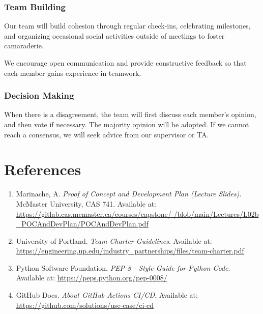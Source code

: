 \documentclass{article}
\begin{document}
\subsubsection*{Team Building}

Our team will build cohesion through regular check-ins, 
celebrating milestones, and organizing occasional social 
activities outside of meetings to foster camaraderie.

We encourage open communication and provide constructive feedback so that 
each member gains experience in teamwork.

\subsubsection*{Decision Making} 


When there is a disagreement, the team will first discuss each member's opinion, 
and then vote if necessary. The majority opinion will be adopted.
If we cannot reach a consensus, we will seek advice from our supervisor or TA.


\newpage{}

\section*{References}

\begin{enumerate}
  \item Marinache, A. \textit{Proof of Concept and Development Plan (Lecture Slides)}. McMaster University, CAS 741.  
  Available at: \url{https://gitlab.cas.mcmaster.ca/courses/capstone/-/blob/main/Lectures/L02b_POCAndDevPlan/POCAndDevPlan.pdf}

  \item University of Portland. \textit{Team Charter Guidelines}.  
  Available at: \url{https://engineering.up.edu/industry_partnerships/files/team-charter.pdf}

  \item Python Software Foundation. \textit{PEP 8 - Style Guide for Python Code}.  
  Available at: \url{https://peps.python.org/pep-0008/}

  \item GitHub Docs. \textit{About GitHub Actions CI/CD}.  
  Available at: \url{https://github.com/solutions/use-case/ci-cd}
\end{enumerate}
\end{document}
